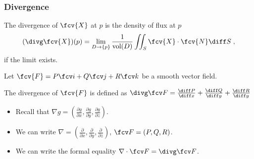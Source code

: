\begin{frame}
\frametitle{Divergence}
\begin{definition}
The divergence of $\fcv{X}$ at $p$ is the density of flux at $p$
\[
(\divg \fcv{X})(p) = \lim_{D\to \{p\}} \frac{1}{\text{vol}(D)} \iint_S \fcv{X} \cdot \fcv{N}\diff S \; ,
\]
if the limit exists.
\end{definition}


Let $\fcv{F}=P\fcv i+Q\fcv j+R\fcv k$ be a smooth vector field.
\begin{theorem}
The divergence of $\fcv{F}$ is defined as
$\divg \fcv F =\frac{\diff P}{\diff x}+\frac{\diff Q}{\diff y}+\frac{\diff R}{\diff y}$
\end{theorem}
\begin{itemize}
\item Recall that $\nabla g =\left(\frac{\partial g}{\partial x}, \frac{\partial g}{\partial y}, \frac{\partial g}{\partial z}  \right)$.
\item We can write $\nabla =\left(\frac{\partial }{\partial x}, \frac{\partial }{\partial y}, \frac{\partial }{\partial z}  \right)$, $\fcv F=\left(P,Q,R\right)$.
\item We can write the formal equality $\nabla \cdot \fcv F=\divg \fcv F$. 
\end{itemize}
\end{frame}